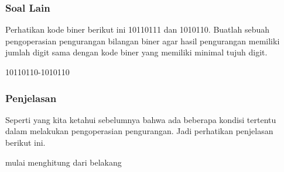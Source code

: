 \subsubsection{Soal Lain}

Perhatikan kode biner berikut ini 10110111 dan 1010110. Buatlah sebuah pengoperasian pengurangan bilangan biner agar hasil
pengurangan memiliki jumlah digit sama dengan kode biner yang memiliki minimal tujuh digit.

10110110-1010110

\subsubsection{Penjelasan}
Seperti yang kita ketahui sebelumnya bahwa ada beberapa kondisi tertentu dalam melakukan pengoperasian pengurangan. Jadi perhatikan
penjelasan berikut ini.

mulai menghitung dari belakang 